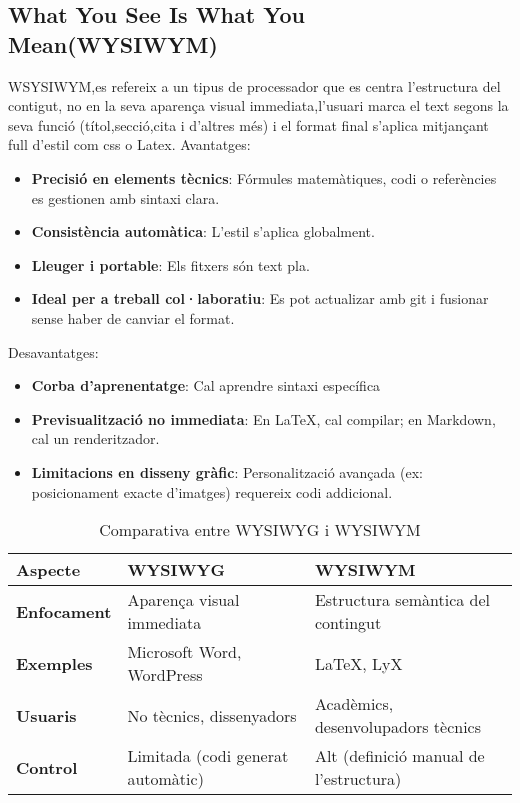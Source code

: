 \subsection{What You See Is What You Mean(WYSIWYM)}
WSYSIWYM,es refereix a un tipus de processador que es centra l'estructura del contigut, no en la seva aparença visual immediata,l'usuari marca el text segons la seva funció (títol,secció,cita i d'altres més) i el format final s'aplica mitjançant full d'estil com css o Latex.
Avantatges:
\begin{itemize}
\item \textbf{Precisió en elements tècnics}: Fórmules matemàtiques, codi o referències es gestionen amb sintaxi clara.
\item \textbf{Consistència automàtica}: L'estil s'aplica globalment.
\item \textbf{Lleuger i portable}: Els fitxers són text pla.
 \item \textbf{Ideal per a treball col·laboratiu}: Es pot actualizar amb git i fusionar sense haber de canviar el format.
\end{itemize}
Desavantatges:
\begin{itemize}
\item \textbf{Corba d'aprenentatge}: Cal aprendre sintaxi específica
 \item \textbf{Previsualització no immediata}: En LaTeX, cal compilar; en Markdown, cal un renderitzador.
 \item \textbf{Limitacions en disseny gràfic}: Personalització avançada (ex: posicionament exacte d'imatges) requereix codi addicional.
\end{itemize}

\begin{table}[h!]
\begin{tabular}{|l|l|l|}
\hline
\textbf{Aspecte} & \textbf{WYSIWYG} & \textbf{WYSIWYM} \\ \hline
\textbf{Enfocament} & Aparença visual immediata & Estructura semàntica del contingut \\ \hline
\textbf{Exemples} & Microsoft Word, WordPress & LaTeX, LyX \\ \hline
\textbf{Usuaris} & No tècnics, dissenyadors &  Acadèmics, desenvolupadors tècnics \\ \hline
\textbf{Control} &  Limitada (codi generat automàtic) & Alt (definició manual de l'estructura) \\ \hline
\end{tabular}
\caption{Comparativa entre WYSIWYG i WYSIWYM}
\end{table}



